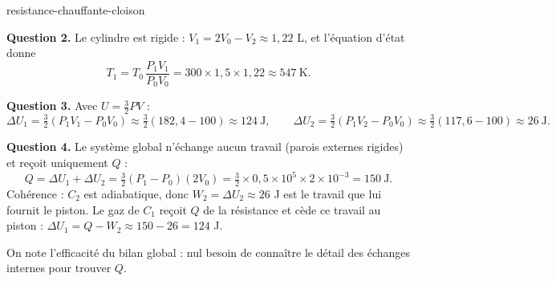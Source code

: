 \begin{exo}{resistance-chauffante-cloison}
\begin{solution}
\textbf{Question 2.} Le cylindre est rigide : $V_1 = 2V_0 - V_2 \approx 1{,}22$ L, et l'équation d'état donne
\[
T_1 = T_0\,\frac{P_1V_1}{P_0V_0} = 300 \times 1{,}5 \times 1{,}22 \approx 547\ \text{K}.
\]

\textbf{Question 3.} Avec $U = \tfrac{3}{2}PV$ :
\[
\Delta U_1 = \tfrac{3}{2}(P_1V_1 - P_0V_0) \approx \tfrac{3}{2}(182{,}4 - 100) \approx 124\ \text{J},
\qquad
\Delta U_2 = \tfrac{3}{2}(P_1V_2 - P_0V_0) \approx \tfrac{3}{2}(117{,}6 - 100) \approx 26\ \text{J}.
\]

\textbf{Question 4.} Le système global n'échange aucun travail (parois externes rigides) et reçoit uniquement $Q$ :
\[
Q = \Delta U_1 + \Delta U_2 = \tfrac{3}{2}(P_1 - P_0)(2V_0) = \tfrac{3}{2}\times 0{,}5\times10^5 \times 2\times10^{-3} = 150\ \text{J}.
\]
Cohérence : $C_2$ est adiabatique, donc $W_2 = \Delta U_2 \approx 26$ J est le travail que lui fournit le piston. Le gaz de $C_1$ reçoit $Q$ de la résistance et cède ce travail au piston : $\Delta U_1 = Q - W_2 \approx 150 - 26 = 124$ J.

On note l'efficacité du bilan global : nul besoin de connaître le détail des échanges internes pour trouver $Q$.
\end{solution}
\end{exo}

